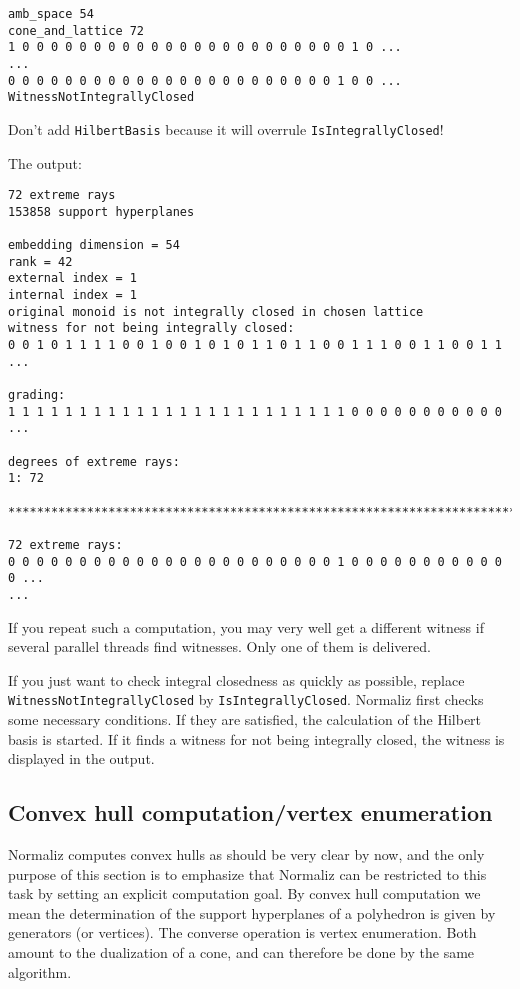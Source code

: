 \documentclass[12pt,a4paper]{scrartcl}
\theoremstyle{definition}
\begin{document}
\begin{Verbatim}
amb_space 54
cone_and_lattice 72
1 0 0 0 0 0 0 0 0 0 0 0 0 0 0 0 0 0 0 0 0 0 0 0 1 0 ...
...
0 0 0 0 0 0 0 0 0 0 0 0 0 0 0 0 0 0 0 0 0 0 0 1 0 0 ...
WitnessNotIntegrallyClosed
\end{Verbatim}
Don't add \verb|HilbertBasis| because it will overrule \verb|IsIntegrallyClosed|!

The output:
\begin{Verbatim}
72 extreme rays
153858 support hyperplanes

embedding dimension = 54
rank = 42
external index = 1
internal index = 1
original monoid is not integrally closed in chosen lattice
witness for not being integrally closed:
0 0 1 0 1 1 1 1 0 0 1 0 0 1 0 1 0 1 1 0 1 1 0 0 1 1 1 0 0 1 1 0 0 1 1 ...

grading:
1 1 1 1 1 1 1 1 1 1 1 1 1 1 1 1 1 1 1 1 1 1 1 1 0 0 0 0 0 0 0 0 0 0 0 ...

degrees of extreme rays:
1: 72  

***********************************************************************

72 extreme rays:
0 0 0 0 0 0 0 0 0 0 0 0 0 0 0 0 0 0 0 0 0 0 0 1 0 0 0 0 0 0 0 0 0 0 0 0 ...
...
\end{Verbatim}

If you repeat such a computation, you may very well get a different witness if several parallel threads find witnesses. Only one of them is delivered.

If you just want to check integral closedness as quickly as possible, replace \verb|WitnessNotIntegrallyClosed| by \verb|IsIntegrallyClosed|. Normaliz first checks some necessary conditions. If they are satisfied, the calculation of the Hilbert basis is started. If it finds a witness for not being integrally closed, the witness is displayed in the output.
\subsection{Convex hull computation/vertex enumeration}

Normaliz computes convex hulls as should be very clear by now, and the only purpose of this section is to emphasize that Normaliz can be restricted to this task by setting an explicit computation goal. By convex hull computation we mean the determination of the support hyperplanes of a polyhedron is given by generators (or vertices). The converse operation is vertex enumeration. Both amount to the dualization of a cone, and can therefore be done by the same algorithm.
\end{document}
